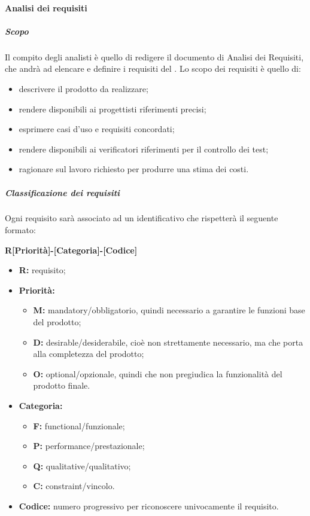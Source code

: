 		\paragraph{Analisi dei requisiti}
			\subparagraph{Scopo}
			Il compito degli analisti è quello di redigere il documento di Analisi dei Requisiti, che andrà ad elencare e definire i requisiti del . Lo scopo dei requisiti è quello di:
			\begin{itemize}
				\item descrivere il prodotto da realizzare;
				\item rendere disponibili ai progettisti riferimenti precisi;
				\item esprimere casi d'uso e requisiti concordati;
				\item rendere disponibili ai verificatori riferimenti per il controllo dei test;
				\item ragionare sul lavoro richiesto per produrre una stima dei costi.
			\end{itemize}
			\subparagraph{Classificazione dei requisiti}
			Ogni requisito sarà associato ad un identificativo che rispetterà il seguente formato:
			\begin{center}
				\textbf{R[Priorità]-[Categoria]-[Codice]}
			\end{center}
			\begin{itemize}
				\item \textbf{R:} requisito;
				\item \textbf{Priorità:}
				\begin{itemize}
					\item \textbf{M:} mandatory/obbligatorio, quindi necessario a garantire le funzioni base del prodotto;
					\item \textbf{D:} desirable/desiderabile, cioè non strettamente necessario, ma che porta alla completezza del prodotto;
					\item \textbf{O:} optional/opzionale, quindi che non pregiudica la funzionalità del prodotto finale.
				\end{itemize}
				\item \textbf{Categoria:}
				\begin{itemize}
					\item \textbf{F:} functional/funzionale;
					\item \textbf{P:} performance/prestazionale;
					\item \textbf{Q:} qualitative/qualitativo;
					\item \textbf{C:} constraint/vincolo.
				\end{itemize}
				\item \textbf{Codice:} numero progressivo per riconoscere univocamente il requisito.
			\end{itemize}
